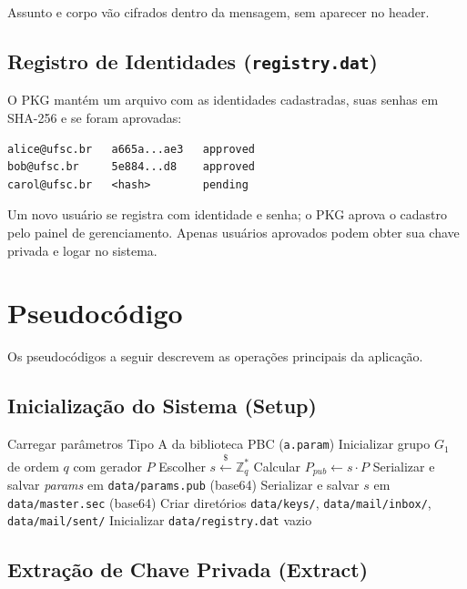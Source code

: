 Assunto e corpo vão cifrados dentro da mensagem, sem aparecer no header.

\subsection{Registro de Identidades (\texttt{registry.dat})}

O PKG mantém um arquivo com as identidades cadastradas, suas senhas em SHA-256 e se foram
aprovadas:

\begin{verbatim}
alice@ufsc.br   a665a...ae3   approved
bob@ufsc.br     5e884...d8    approved
carol@ufsc.br   <hash>        pending
\end{verbatim}

Um novo usuário se registra com identidade e senha; o PKG aprova o cadastro pelo painel de
gerenciamento. Apenas usuários aprovados podem obter sua chave privada e logar no sistema.


\section{Pseudocódigo}
\label{sec:pseudocodigo}

Os pseudocódigos a seguir descrevem as operações principais da aplicação.

\subsection{Inicialização do Sistema (Setup)}

\begin{algorithm}[H]
\caption{IBE Mail -- Setup}
\begin{algorithmic}[1]
  \State Carregar parâmetros Tipo A da biblioteca PBC (\texttt{a.param})
  \State Inicializar grupo $G_1$ de ordem $q$ com gerador $P$
  \State Escolher $s \xleftarrow{\$} \mathbb{Z}_q^*$ 
  \State Calcular $P_{\mathit{pub}} \leftarrow s \cdot P$
  \State Serializar e salvar \textit{params} em \texttt{data/params.pub} (base64)
  \State Serializar e salvar $s$ em \texttt{data/master.sec} (base64)
  \State Criar diretórios \texttt{data/keys/}, \texttt{data/mail/inbox/}, \texttt{data/mail/sent/}
  \State Inicializar \texttt{data/registry.dat} vazio
\EndProcedure
\end{algorithmic}
\end{algorithm}

\subsection{Extração de Chave Privada (Extract)}

